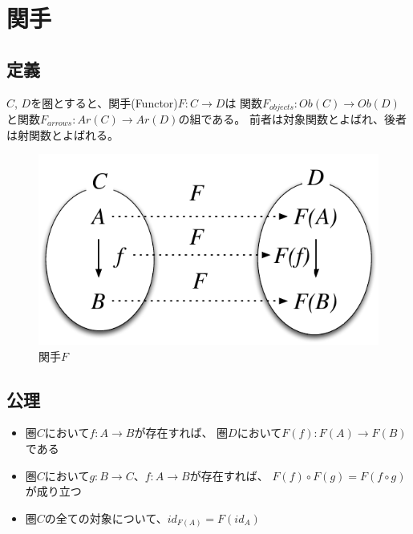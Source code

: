 
\newpage
\section{関手}

\subsection{定義}
$C$, $D$を圏とすると、関手(Functor)$F:C \to D$は
関数$F_{objects}:Ob(C) \to Ob(D)$と関数$F_{arrows}:Ar(C)\to Ar(D)$の組である。
前者は対象関数とよばれ、後者は射関数とよばれる。

\begin{figure}[htbp]
    \centering
    \includegraphics{diag_functor.pdf}
    \caption{関手$F$}
\end{figure}

\subsection{公理}
\begin{itemize}
    \item 圏$C$において$f:A\to B$が存在すれば、
        圏$D$において$F(f):F(A)\to F(B)$である
    \item 圏$C$において$g:B\to C$、$f:A\to B$が存在すれば、
        $F(f)\circ F(g)=F(f\circ g)$が成り立つ
    \item 圏$C$の全ての対象について、$id_{F(A)}=F(id_A)$
\end{itemize}

